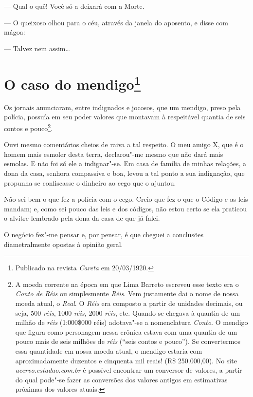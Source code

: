 --- Qual o quê! Você só a deixará com a Morte.

--- O queixoso olhou para o céu, através da janela do aposento, e disse
com mágoa:

--- Talvez nem assim\ldots{}



\chapter[O caso do mendigo]{O caso do mendigo\footnote[*]{Publicado na revista \emph{Careta} em 20/03/1920.}}

Os jornais anunciaram, entre indignados e jocosos, que um mendigo, preso
pela polícia, possuía em seu poder valores que montavam à respeitável
quantia de seis contos e pouco\footnote{A moeda corrente na época em que
  Lima Barreto escreveu esse texto era o \emph{Conto de Réis} ou
  simplesmente \emph{Réis}. Vem justamente dai o nome de nossa moeda
  atual, o \emph{Real}. O \emph{Réis} era composto a partir de unidades
  decimais, ou seja, 500 \emph{réis}, 1000 \emph{réis,} 2000
  \emph{réis}, etc. Quando se chegava à quantia de um milhão de
  \emph{réis} (1:000\$000 réis) adotava"-se a nomenclatura
  \emph{Conto}. O mendigo que figura como personagem nessa crônica
  estava com uma quantia de um pouco mais de seis milhões de \emph{réis}
  (``seis contos e pouco''). Se convertermos essa quantidade em nossa
  moeda atual, o mendigo estaria com aproximadamente duzentos e
  cinquenta mil reais! (R\$ 250.000,00). No site
  \emph{acervo.estadao.com.br} é
  possível encontrar um conversor de valores, a partir do qual pode"-se
  fazer as conversões dos valores antigos em estimativas próximas dos
  valores atuais.}.

Ouvi mesmo comentários cheios de raiva a tal respeito. O meu amigo X,
que é o homem mais esmoler desta terra, declarou"-me mesmo que não dará
mais esmolas. E não foi só ele a indignar"-se. Em casa de família de
minhas relações, a dona da casa, senhora compassiva e boa, levou a tal
ponto a sua indignação, que propunha se confiscasse o dinheiro ao cego
que o ajuntou.

Não sei bem o que fez a polícia com o cego. Creio que fez o que o Código
e as leis mandam; e, como sei pouco das leis e dos códigos, não estou
certo se ela praticou o alvitre lembrado pela dona da casa de que já
falei.

O negócio fez"-me pensar e, por pensar, é que cheguei a conclusões
diametralmente opostas à opinião geral.

